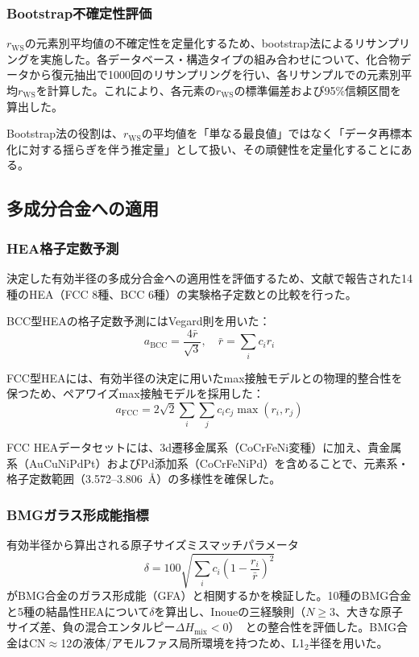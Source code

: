 \documentclass[a4paper,10pt,5p]{elsarticle}
\begin{document}
\subsubsection{Bootstrap不確定性評価}
$r_\mathrm{WS}$の元素別平均値の不確定性を定量化するため、bootstrap法によるリサンプリングを実施した。各データベース・構造タイプの組み合わせについて、化合物データから復元抽出で1000回のリサンプリングを行い、各リサンプルでの元素別平均$r_\mathrm{WS}$を計算した。これにより、各元素の$r_\mathrm{WS}$の標準偏差および95\%信頼区間を算出した。

Bootstrap法の役割は、$r_\mathrm{WS}$の平均値を「単なる最良値」ではなく「データ再標本化に対する揺らぎを伴う推定量」として扱い、その頑健性を定量化することにある。


\subsection{多成分合金への適用}

\subsubsection{HEA格子定数予測}
決定した有効半径の多成分合金への適用性を評価するため、文献で報告された14種のHEA（FCC 8種、BCC 6種）の実験格子定数との比較を行った。

BCC型HEAの格子定数予測にはVegard則を用いた：
\begin{equation}
    a_\mathrm{BCC} = \frac{4\bar{r}}{\sqrt{3}}, \quad \bar{r} = \sum_i c_i r_i
    \label{eq:bcc_vegard}
\end{equation}

FCC型HEAには、有効半径の決定に用いたmax接触モデルとの物理的整合性を保つため、ペアワイズmax接触モデルを採用した：
\begin{equation}
    a_\mathrm{FCC} = 2\sqrt{2}\sum_i \sum_j c_i c_j \max(r_i, r_j)
    \label{eq:fcc_pairwise}
\end{equation}

FCC HEAデータセットには、3d遷移金属系（CoCrFeNi変種）に加え、貴金属系（AuCuNiPdPt）およびPd添加系（CoCrFeNiPd）を含めることで、元素系・格子定数範囲（3.572--3.806~\AA）の多様性を確保した。

\subsubsection{BMGガラス形成能指標}
有効半径から算出される原子サイズミスマッチパラメータ
\begin{equation}
    \delta = 100\sqrt{\sum_i c_i \left(1 - \frac{r_i}{\bar{r}}\right)^2}
    \label{eq:delta}
\end{equation}
がBMG合金のガラス形成能（GFA）と相関するかを検証した。10種のBMG合金と5種の結晶性HEAについて$\delta$を算出し、Inoueの三経験則（$N \geq 3$、大きな原子サイズ差、負の混合エンタルピー$\Delta H_\mathrm{mix} < 0$）~\cite{inoue2000}との整合性を評価した。BMG合金はCN$\approx$12の液体/アモルファス局所環境を持つため、L1$_2$半径を用いた。
\end{document}
